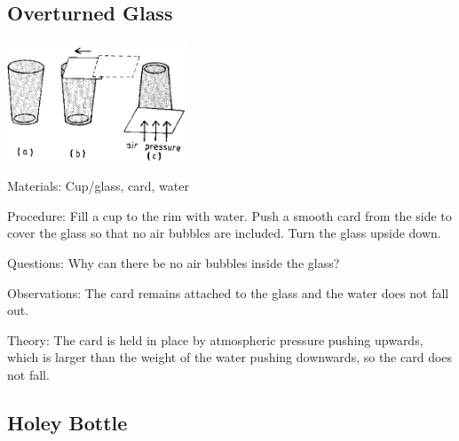 \begin{multicols}{2}
\subsection{Overturned Glass}

\begin{center}
\includegraphics[width=0.4\textwidth]{./img/source/overturned-glass.png}
\end{center}

\begin{description*}
\item[Materials:]{Cup/glass, card, water}
\item[Procedure:]{Fill a cup to the rim with water. Push a smooth card from the side to cover the glass so that no air bubbles are included. Turn the glass upside down.}
\item[Questions:]{Why can there be no air bubbles inside the glass?}
\item[Observations:]{The card remains attached to the glass and the water does not fall out.}
\item[Theory:]{The card is held in place by atmospheric pressure pushing upwards, which is larger than the weight of the water pushing downwards, so the card does not fall.}
\end{description*}

\subsection{Holey Bottle}



\end{multicols}
